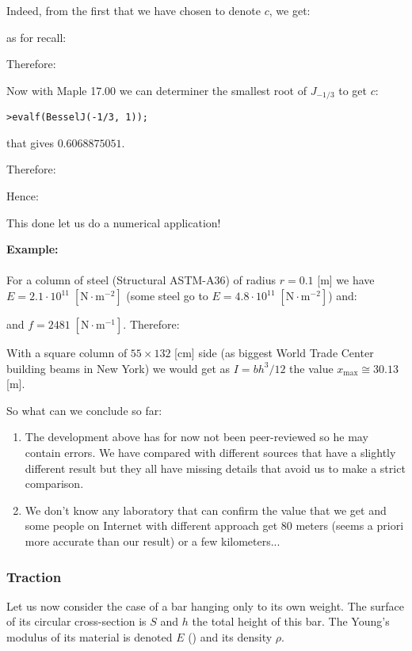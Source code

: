 	Indeed, from the first that we have chosen to denote $c$, we get:
	
	as for recall:
	
	Therefore:
	
	Now with Maple 17.00 we can determiner the smallest root of $J_{-1/3}$ to get $c$:
	
	\texttt{>evalf(BesselJ(-1/3, 1));}
	
	that gives $0.6068875051$. 
	
	Therefore:
	
	Hence:
	
	This done let us do a numerical application!
	
	\begin{tcolorbox}[colframe=black,colback=white,sharp corners]
	\textbf{{\Large {}}Example:}\\\\
	For a column of steel (Structural ASTM-A36) of radius $r=0.1$ [m] we have $E=2.1\cdot 10^{11}\;[\text{N}\cdot\text{m}^{-2}]$ (some steel go to $E=4.8\cdot 10^{11}\;[\text{N}\cdot\text{m}^{-2}]$) and:
	
	and $f=2481\;[\text{N}\cdot \text{m}^{-1}]$. Therefore:
	
	With a square column of $55\times 132$ [cm] side (as biggest World Trade Center building beams in New York) we would get as $I=bh^3/12$ the value $x_{\max}\cong 30.13$[m].
	\end{tcolorbox}
	So what can we conclude so far:
	\begin{enumerate}
		\item The development above has for now not been peer-reviewed so he may contain errors. We have compared with different sources that have a slightly different result but they all have missing details that avoid us to make a strict comparison.
		
		\item We don't know any laboratory that can confirm the value that we get and some people on Internet with different approach get $80$ meters (seems a priori more accurate than our result) or a few kilometers...
	\end{enumerate}
	
	\subsubsection{Traction}
	Let us now consider the case of a bar hanging only to its own weight. The surface of its circular cross-section is $S$ and $h$ the total height of this bar. The Young's modulus of its material is denoted $E$ () and its density $\rho$.

